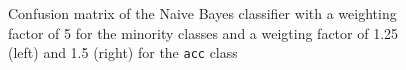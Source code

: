 \documentclass[a4paper]{article}
\begin{document}
\begin{figure}[h]
  \centering
  \caption{Confusion matrix of the Naive Bayes classifier with a weighting factor of 5 for the minority classes and a weigting factor of 1.25 (left) and 1.5 (right) for the \lstinline{acc} class}
  \label{fig:NBCcm_acc_class_weight_factor}
\end{figure}
\end{document}
